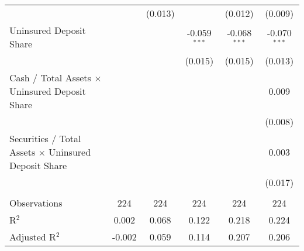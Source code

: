 \begin{table}[htbp]
\begin{adjustbox}{width = 1.2\textwidth, center}
\begin{tabular}{lccccc}
                                                                     &                & (0.013)        &                & (0.012)        & (0.009)\\   
         Uninsured Deposit Share                                     &                &                & -0.059$^{***}$ & -0.068$^{***}$ & -0.070$^{***}$\\   
                                                                     &                &                & (0.015)        & (0.015)        & (0.013)\\   
         Cash / Total Assets $\times$ Uninsured Deposit Share        &                &                &                &                & 0.009\\   
                                                                     &                &                &                &                & (0.008)\\   
         Securities / Total Assets $\times$ Uninsured Deposit Share  &                &                &                &                & 0.003\\   
                                                                     &                &                &                &                & (0.017)\\   
          \\
         Observations                                                & 224            & 224            & 224            & 224            & 224\\  
         R$^2$                                                       & 0.002          & 0.068          & 0.122          & 0.218          & 0.224\\  
         Adjusted R$^2$                                              & -0.002         & 0.059          & 0.114          & 0.207          & 0.206\\  
         \bottomrule
      \end{tabular}
   \end{adjustbox}
\end{table}


